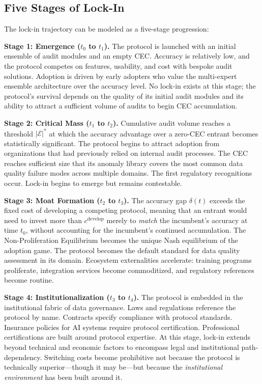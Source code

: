 \documentclass[12pt,a4paper]{ctexart}
\theoremstyle{definition}
\theoremstyle{remark}
\begin{document}
\subsection{Five Stages of Lock-In}

The lock-in trajectory can be modeled as a five-stage progression:

\textbf{Stage 1: Emergence ($t_0$ to $t_1$).} The protocol is launched with an initial ensemble of audit modules and an empty CEC. Accuracy is relatively low, and the protocol competes on features, usability, and cost with bespoke audit solutions. Adoption is driven by early adopters who value the multi-expert ensemble architecture over the accuracy level. No lock-in exists at this stage; the protocol's survival depends on the quality of its initial audit modules and its ability to attract a sufficient volume of audits to begin CEC accumulation.

\textbf{Stage 2: Critical Mass ($t_1$ to $t_2$).} Cumulative audit volume reaches a threshold $|\mathcal{E}|^*$ at which the accuracy advantage over a zero-CEC entrant becomes statistically significant. The protocol begins to attract adoption from organizations that had previously relied on internal audit processes. The CEC reaches sufficient size that its anomaly library covers the most common data quality failure modes across multiple domains. The first regulatory recognitions occur. Lock-in begins to emerge but remains contestable.

\textbf{Stage 3: Moat Formation ($t_2$ to $t_3$).} The accuracy gap $\delta(t)$ exceeds the fixed cost of developing a competing protocol, meaning that an entrant would need to invest more than $c^{\text{develop}}$ merely to \textit{match} the incumbent's accuracy at time $t_0$, without accounting for the incumbent's continued accumulation. The Non-Proliferation Equilibrium becomes the unique Nash equilibrium of the adoption game. The protocol becomes the default standard for data quality assessment in its domain. Ecosystem externalities accelerate: training programs proliferate, integration services become commoditized, and regulatory references become routine.

\textbf{Stage 4: Institutionalization ($t_3$ to $t_4$).} The protocol is embedded in the institutional fabric of data governance. Laws and regulations reference the protocol by name. Contracts specify compliance with protocol standards. Insurance policies for AI systems require protocol certification. Professional certifications are built around protocol expertise. At this stage, lock-in extends beyond technical and economic factors to encompass legal and institutional path-dependency. Switching costs become prohibitive not because the protocol is technically superior—though it may be—but because the \textit{institutional environment} has been built around it.
\end{document}
